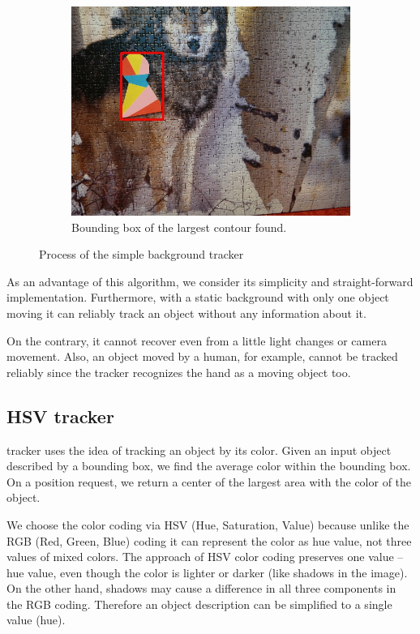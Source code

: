 \begin{figure}
\begin{subfigure}[b]{0.48\linewidth}
    \includegraphics[width=\linewidth]{img/simple_background/result.jpg}
    \caption{Bounding box of the largest contour found.}
  \end{subfigure}
  \caption{Process of the simple background tracker}
  \label{fig:simple-background-tracker}
\end{figure}

As an advantage of this algorithm, we consider its simplicity and
straight-forward implementation. Furthermore, with a static background with
only one object moving it can reliably track an object without any information
about it.

On the contrary, it cannot recover even from a little light changes or camera
movement. Also, an object moved by a human, for example, cannot be tracked
reliably since the tracker recognizes the hand as a moving object
too.

\subsection{HSV tracker}

\hsv{} tracker uses the idea of tracking an object by its color. Given an input
object described by a bounding box, we find the average color within the
bounding box. On a position request, we return a center of the largest area
with the color of the object.

We choose the color coding via HSV (Hue, Saturation, Value) because unlike the RGB (Red,
Green, Blue) coding it can represent the color as hue value, not three values of
mixed colors. The approach of HSV color coding preserves one value -- hue
value,  even though the color is lighter or darker (like shadows in the image).
On the other hand, shadows may cause a difference in all three
components in the RGB coding. Therefore an object description can be simplified
to a single value (hue).


